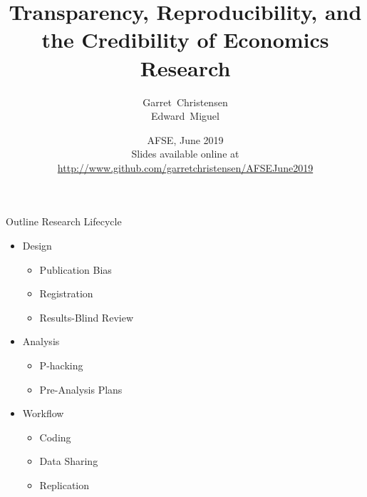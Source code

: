 \documentclass[aspectratio=169]{beamer}
\title[Transparency and Reproducibility of Economics] %
{Transparency, Reproducibility, and the Credibility of Economics Research}
\subtitle
{}
\author[Christensen] %
{Garret~Christensen\inst{1} \\
Edward~Miguel\inst{2}}
\institute[Universities of Somewhere and Elsewhere] %
{
  \inst{1}%
 U.S. Census Bureau\\
\inst{2}
University of California Berkeley \\
Any opinions and conclusions expressed herein are those of the author(s) and do not necessarily represent the views of the U.S. Census Bureau. 
}
\date[BITSS2014] %
{AFSE, June 2019\\
Slides available online at \url{http://www.github.com/garretchristensen/AFSEJune2019}}
\begin{document}
\begin{frame}
  \titlepage
\end{frame}


\begin{frame}{Outline}
Research Lifecycle
\begin{itemize}
\item Design
	\begin{itemize}
\item Publication Bias
\item Registration
\item Results-Blind Review 
\end{itemize}
\item Analysis 
\begin{itemize}
\item P-hacking
\item Pre-Analysis Plans
\end{itemize}
\item Workflow
\begin{itemize}
\item Coding
\item Data Sharing
\item Replication
\end{itemize}
\end{itemize}
\end{frame}



\end{document}
